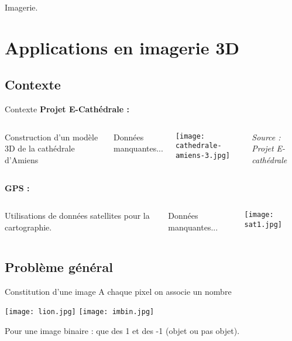 \documentclass[11pt]{beamer}
\begin{document}
\begin{frame}
\begin{center}
Imagerie.
\end{center}
\end{frame}


\section{Applications en imagerie 3D}
\subsection{Contexte}
\begin{frame}{Contexte}
\textbf{Projet E-Cathédrale :}
\begin{columns}
\begin{block}{}
Construction d'un modèle 3D de la cathédrale d'Amiens
\end{block}
\begin{alertblock}{}
Données manquantes...
\end{alertblock}
\begin{center}
\texttt{[image: cathedrale-amiens-3.jpg]}
\end{center}
\begin{tiny}
\begin{flushright}
\textit{Source : Projet E-cathédrale}
\end{flushright}
\end{tiny}
\end{columns}
\end{frame}


\begin{frame}
\textbf{GPS :}
\begin{columns}
\begin{block}{}
Utilisations de données satellites pour la cartographie.
\end{block}
\begin{alertblock}{}
Données manquantes...
\end{alertblock}
\begin{center}
\texttt{[image: sat1.jpg]}
\end{center}
\end{columns}
\end{frame}

\subsection{Problème général}
\begin{frame}{Constitution d'une image}
A chaque pixel on associe un nombre

\begin{center}
\texttt{[image: lion.jpg]}
\texttt{[image: imbin.jpg]}
\end{center}

Pour une image binaire : que des 1 et des -1 (objet ou pas objet).

\end{frame}
\end{document}
